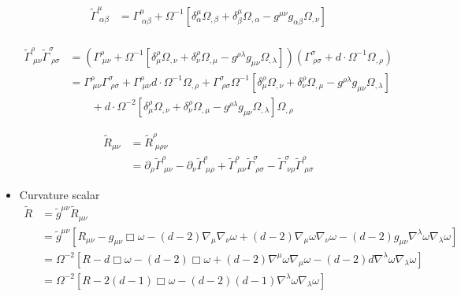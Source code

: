 \documentclass[10pt,a4paper]{book}
\theoremstyle{definition}
\begin{document}
\begin{itemize}
\begin{align}
\tilde\Gamma^\mu_{\;\alpha\beta}
&=\Gamma^\mu_{\;\alpha\beta}+\Omega^{-1}\left[
 \delta^\mu_\alpha\Omega_{,\beta}
+\delta_\beta^\mu\Omega_{,\alpha}
-g^{\mu\nu}g_{\alpha\beta}\Omega_{,\nu}
\right]\\
\end{align}

\begin{align}
\tilde\Gamma^\rho_{\;\mu\nu}\tilde\Gamma^\sigma_{\;\rho\sigma}
&=\left(\Gamma^\rho_{\;\mu\nu}+\Omega^{-1}\left[
 \delta^\rho_\mu\Omega_{,\nu}
+\delta_\nu^\rho\Omega_{,\mu}
-g^{\rho\lambda}g_{\mu\nu}\Omega_{,\lambda}
\right]\right)\left(\Gamma^\sigma_{\;\rho\sigma}+d\cdot\Omega^{-1}\Omega_{,\rho}\right)\\
&=\Gamma^\rho_{\;\mu\nu}\Gamma^\sigma_{\;\rho\sigma}
+\Gamma^\rho_{\;\mu\nu}d\cdot\Omega^{-1}\Omega_{,\rho}
+\Gamma^\sigma_{\;\rho\sigma}\Omega^{-1}\left[
 \delta^\rho_\mu\Omega_{,\nu}
+\delta_\nu^\rho\Omega_{,\mu}
-g^{\rho\lambda}g_{\mu\nu}\Omega_{,\lambda}
\right]\\
&\qquad+
d\cdot\Omega^{-2}\left[
 \delta^\rho_\mu\Omega_{,\nu}
+\delta_\nu^\rho\Omega_{,\mu}
-g^{\rho\lambda}g_{\mu\nu}\Omega_{,\lambda}
\right]\Omega_{,\rho}
\end{align}



\begin{align}
    \tilde{R}_{\mu\nu}
    &=\tilde{R}^\rho_{\;\mu\rho\nu}\\
    &=\partial_\rho\tilde\Gamma^\rho_{\;\mu\nu}
    -\partial_\nu\tilde\Gamma^\rho_{\;\mu\rho}
    +\tilde\Gamma^\rho_{\;\mu\nu}\tilde\Gamma^\sigma_{\;\rho\sigma}
    -\tilde\Gamma^\sigma_{\;\nu\rho}\tilde\Gamma^\rho_{\;\mu\sigma}
\end{align}

\item Curvature scalar
\begin{align}
    \tilde{R}
    &=\tilde{g}^{\mu\nu}\tilde{R}_{\mu\nu}\\
    &=\tilde{g}^{\mu\nu}\left[R_{\mu\nu}-g_{\mu\nu}\Box\omega-(d-2)\nabla_\mu\nabla_\nu\omega+(d-2)\nabla_\mu\omega\nabla_\nu\omega-(d-2)g_{\mu\nu}\nabla^\lambda\omega\nabla_\lambda\omega\right]\\
    &=\Omega^{-2}\left[R-d\Box\omega-(d-2)\Box\omega+(d-2)\nabla^\mu\omega\nabla_\mu\omega-(d-2)d\nabla^\lambda\omega\nabla_\lambda\omega\right]\\
    &=\Omega^{-2}\left[R-2(d-1)\Box\omega-(d-2)(d-1)\nabla^\lambda\omega\nabla_\lambda\omega\right]\\
\end{align}

\end{itemize}
\end{document}
